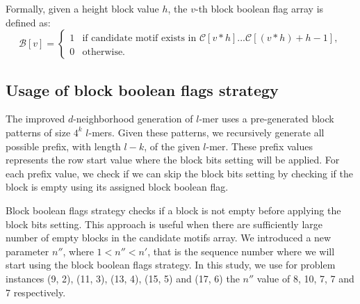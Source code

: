 Formally, given a height block value $h$, the $v$-th block boolean flag array is defined as: 
\begin{equation}
	\mathcal{B}[v] = \left\{
		\begin{array}{rl}
			1 & \text{if candidate motif exists in } \mathcal{C}[v * h] ... \mathcal{C}[(v * h) + h- 1], \\
			0 & \text{otherwise.}
		\end{array} \right. 
\end{equation}



\subsection{Usage of block boolean flags strategy}

The improved $d$-neighborhood generation of $l$-mer uses a pre-generated block patterns of size $4^k$ $l$-mers. Given these patterns, we recursively generate all possible prefix, with length $l - k$, of the given $l$-mer. These prefix values represents the row start value where the block bits setting will be applied. For each prefix value, we check if we can skip the block bits setting by checking if the block is empty using its assigned block boolean flag. 


% 

Block boolean flags strategy checks if a block is not empty before applying the block bits setting. This approach is useful when there are sufficiently large number of empty blocks in the candidate motifs array. We introduced a new parameter $n''$, where $1 < n'' < n'$, that is the sequence number where we will start using the block boolean flags strategy. In this study, we use for problem instances (9, 2), (11, 3), (13, 4), (15, 5) and (17, 6) the $n''$ value of 8, 10, 7, 7 and 7 respectively.



